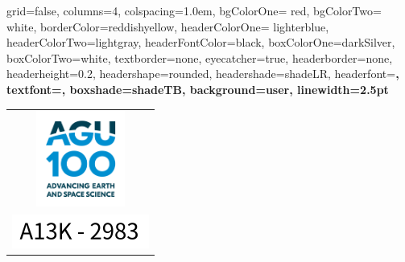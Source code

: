 \documentclass[landscape,paperwidth=1189mm,paperheight=841mm,fontscale=0.4,margin=.7cm]{baposter}
\begin{document}
\begin{poster}%
  {
  grid=false, %
  columns=4,
  colspacing=1.0em,
  bgColorOne= red, %
  bgColorTwo= white, %
  borderColor=reddishyellow, %
  headerColorOne= lighterblue, %
  headerColorTwo=lightgray, 
  headerFontColor=black, %
  boxColorOne=darkSilver, %
  boxColorTwo=white,
  textborder=none, %
  eyecatcher=true,
  headerborder=none, %
  headerheight=0.2\textheight,
  headershape=rounded, %
  headershade=shadeLR,
  headerfont=\LARGE\bf,  %
  textfont={\color{black}\setlength{\parindent}{1.5em}},
  boxshade=shadeTB, %
  background=user, %
  linewidth=2.5pt
  }
  {\begin{tabular}{c}
      \includegraphics[height=8.5em]{AGU100_logo_V-CMYK.png}\\
      \vspace{3em}
      \includegraphics[height=3.0em]{PosterNumber.png}
      

\end{tabular}}
\end{poster}
\end{document}

